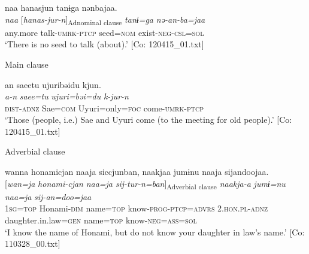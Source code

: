 \ex
{\TM}
\glll  naa  hanasjun  tanɨga  nənbajaa.\\
\textit{naa}  [\textit{hanas-jur-n}]\textsubscript{Adnominal clause}  \textit{tanɨ=ga}  \textit{nə-an-ba=jaa}\\
any.more  talk-\textsc{umrk}-\textsc{ptcp}  seed=\textsc{nom}  exist-\textsc{neg}-\textsc{csl}=\textsc{sol}\\
\glt ‘There is no seed to talk (about).’ [Co: 120415\_01.txt]

  Main clause

\ex
{\TM}
\glll  an  saeetu  ujuribəidu  kjun.\\
\textit{a-n}  \textit{saee=tu}  \textit{ujuri=bəi=du}  \textit{k-jur-n}\\
\textsc{dist}-\textsc{adnz}  Sae=\textsc{com}  Uyuri=only=\textsc{foc}  come-\textsc{umrk}-\textsc{ptcp}\\
\glt ‘Those (people, i.e.) Sae and Uyuri come (to the meeting for old people).’ [Co: 120415\_01.txt]

  Adverbial clause

\ex
{\TM}
\glll  wanna  honami{\textbar}cjan{\textbar}  naaja  siccjunban,      naakjaa  jumɨnu  naaja  sijandoojaa.\\
{}[\textit{wan=ja}  \textit{honami-cjan}  \textit{naa=ja}  \textit{sij-tur-n=ban}]\textsubscript{Adverbial clause}      \textit{naakja-a}  \textit{jumɨ=nu}  \textit{naa=ja}  \textit{sij-an=doo=jaa}\\
      1\textsc{sg}=\textsc{top}  Honami-\textsc{dim}  name=\textsc{top}  know-\textsc{prog}-\textsc{ptcp}=\textsc{advrs}  2.\textsc{hon}.\textsc{pl}-\textsc{adnz}  daughter.in.law=\textsc{gen}  name=\textsc{top}  know-\textsc{neg}=\textsc{ass}=\textsc{sol}\\
\glt ‘I know the name of Honami, but do not know your daughter in law’s name.’ [Co: 110328\_00.txt]
\z
\z

